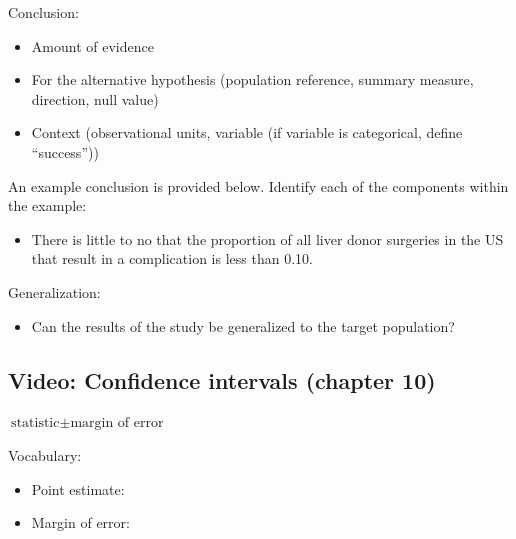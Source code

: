 \documentclass[
]{report}
\providecommand{\tightlist}{%
  \setlength{\itemsep}{0pt}\setlength{\parskip}{0pt}}
\newcommand{\rgi}{\hspace{24pt}}  %
\begin{document}
Conclusion:

\begin{itemize}
\item
  Amount of evidence
\item
  For the alternative hypothesis (population reference, summary measure, direction, null value)
\item
  Context (observational units, variable (if variable is categorical, define ``success''))
\end{itemize}

An example conclusion is provided below. Identify each of the components within the example:

\begin{itemize}
\tightlist
\item
  There is little to no that the proportion of all liver donor surgeries in the US that result in a complication is less than 0.10.
\end{itemize}

\vspace{1mm}

Generalization:

\begin{itemize}
\tightlist
\item
  Can the results of the study be generalized to the target population?
\end{itemize}

\vspace{0.3in}

\subsection*{Video: Confidence intervals (chapter 10)}\label{video-confidence-intervals-chapter-10}

\rgi \(\text{statistic} \pm \text{margin of error}\)

Vocabulary:

\begin{itemize}
\tightlist
\item
  Point estimate:
\end{itemize}

\vspace{0.3in}

\begin{itemize}
\tightlist
\item
  Margin of error:
\end{itemize}
\end{document}
